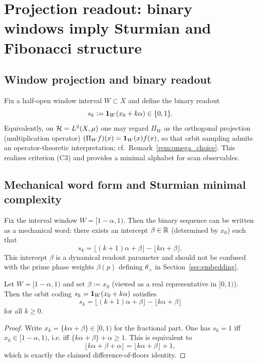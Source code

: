 \section{Projection readout: binary windows imply Sturmian and Fibonacci structure}
\label{sec:readout}

\subsection{Window projection and binary readout}
Fix a half-open window interval $W\subset X$ and define the binary readout
$$
s_k := \mathbf{1}_W(x_0+k\alpha)\in\{0,1\}.
$$
Equivalently, on $\mathcal{H}=L^2(X,\mu)$ one may regard $\Pi_W$ as the orthogonal projection (multiplication operator) $(\Pi_W f)(x)=\mathbf{1}_W(x)f(x)$, so that orbit sampling admits an operator-theoretic interpretation; cf.~Remark~\ref{rem:omega_choice}.
This realizes criterion (C3) and provides a minimal alphabet for scan observables.

\subsection{Mechanical word form and Sturmian minimal complexity}
Fix the interval window $W=[1-\alpha,1)$. Then the binary sequence can be written as a mechanical word: there exists an intercept $\beta\in\mathbb{R}$ (determined by $x_0$) such that
$$
s_k=\big\lfloor (k+1)\alpha+\beta\big\rfloor-\big\lfloor k\alpha+\beta\big\rfloor.
$$
This intercept $\beta$ is a dynamical readout parameter and should not be confused with the prime phase weights $\beta(p)$ defining $\theta_\times$ in Section~\ref{sec:embedding}.

\begin{proposition}
\label{prop:window_mechanical}
Let $W=[1-\alpha,1)$ and set $\beta:=x_0$ (viewed as a real representative in $[0,1)$). Then the orbit coding $s_k=\mathbf{1}_W(x_0+k\alpha)$ satisfies
$$
s_k=\big\lfloor (k+1)\alpha+\beta\big\rfloor-\big\lfloor k\alpha+\beta\big\rfloor
$$
for all $k\ge 0$.
\end{proposition}

\begin{proof}
Write $x_k=\{k\alpha+\beta\}\in[0,1)$ for the fractional part. One has $s_k=1$ iff $x_k\in[1-\alpha,1)$, i.e. iff $\{k\alpha+\beta\}+\alpha\ge 1$. This is equivalent to
$$
\lfloor k\alpha+\beta+\alpha\rfloor=\lfloor k\alpha+\beta\rfloor+1,
$$
which is exactly the claimed difference-of-floors identity.
\end{proof}

